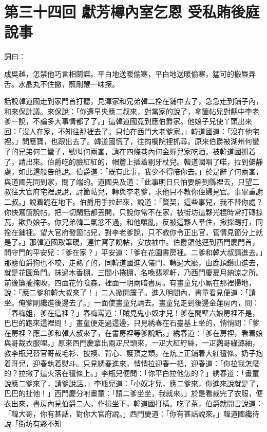 
\chapter*{第三十四回 獻芳樽內室乞恩 受私賄後庭說事}


詞曰：

\begin{myquote} 
成吳越，怎禁他巧言相鬬諜。平白地送暖偷寒，平白地送暖偷寒，猛可的搬唇弄舌。水晶丸不住撇，蘸剛鞭一味撅。

\end{myquote} 

話說韓道國走到家門首打聽，見渾家和兄弟韓二拴在鋪中去了，急急走到鋪子內，和來保計議。來保說：「你還早央應二叔來，對當家的說了，拿箇帖兒對縣中李老爹一說，不論多大事情都了了。」這韓道國竟到應伯爵家。他娘子兒使丫頭出來回：「沒人在家，不知往那裡去了。只怕在西門大老爹家。」韓道國道：「沒在他宅裡。」問應寶，也跟出去了。韓道國慌了，往抅欄院裡抓尋。原來伯爵被湖州何蠻子的兄弟何二蠻子，號叫何兩峯，請在四條巷內何金蟬兒家吃酒。被韓道國抓着了，請出來。伯爵吃的臉紅紅的，帽簷上插着剔牙杖兒。韓道國唱了喏，拉到僻靜處，如此這般告他說。伯爵道：「既有此事，我少不得陪你去。」於是辭了何兩峯，與道國先同到家，問了端的。道國央及道：「此事明日只怕要解到縣裡去，只望二叔往大官府宅裡說說，討箇帖兒，轉與李老爹，求他只不教你侄婦見官。事畢重謝二叔。」說着跪在地下。伯爵用手拉起來，說道：「賢契，這些事兒，我不替你處？你快寫箇說帖，把一切閑話都丟開，只說你常不在家，被街坊這夥光棍時常打磚掠瓦，欺負娘子。你兄弟韓二氣忿不過，和他嚷亂，反被這夥人羣住，揪採踢打，同拴在鋪裡。望大官府發箇帖兒，對李老爹說，只不教你令正出官，管情見箇分上就是了。」那韓道國取筆硯，連忙寫了說帖，安放袖中。伯爵領他逕到西門慶門首，問守門的平安兒：「爹在家？」平安道：「爹在花園書房裡。二爹和韓大叔請進去。」那應伯爵狗也不咬，走熟了的，同韓道國進入儀門，轉過大廳，由鹿頂鑽山進去，就是花園角門。抹過木香棚，三間小捲棚，名喚翡翠軒，乃西門慶夏月納涼之所。前後簾攏掩映，四面花竹陰森，裡面一明兩暗書房。有畫童兒小厮在那裡掃地，說：「應二爹和韓大叔來了！」二人掀開簾子。進入明間內，書童看見便道：「請坐。俺爹剛纔進後邊去了。」一面使畫童兒請去。畫童兒走到後邊金蓮房內，問：「春梅姐，爹在這裡？」春梅罵道：「賊見鬼小奴才兒！爹在間壁六娘房裡不是，巴巴的跑來這裡問！」畫童便走過這邊，只見綉春在石臺基上坐的，悄悄問：「爹在房裡？應二爹和韓大叔來了，在書房裡等爹說話。」綉春道：「爹在房裡，看着娘與哥裁衣服哩。」原來西門慶拿出兩疋尺頭來，一疋大紅紵絲，一疋鸚哥綠潞紬，教李瓶兒替官哥裁毛衫、披襖、背心、護頂之類。在炕上正鋪着大紅氊條。奶子抱着哥兒，迎春執着熨斗。只見綉春進來，悄悄拉迎春一把，迎春道：「你拉我怎麼的？拉撇了這火落在氊條上。」{}李瓶兒便問：「你平白拉他怎的？」綉春道：「畫童說應二爹來了，請爹說話。」李瓶兒道：「小奴才兒，應二爹來，你進來說就是了，巴巴的扯他！」西門慶分咐畫童：「請二爹坐坐，我就來。」於是看裁完了衣服，便衣出來，書房內見伯爵二人，作揖坐下，韓道國打橫。吃了茶，伯爵就開言說道：「韓大哥，你有甚話，對你大官府說。」西門慶道：「你有甚話說來。」韓道國纔待說「街坊有夥不知